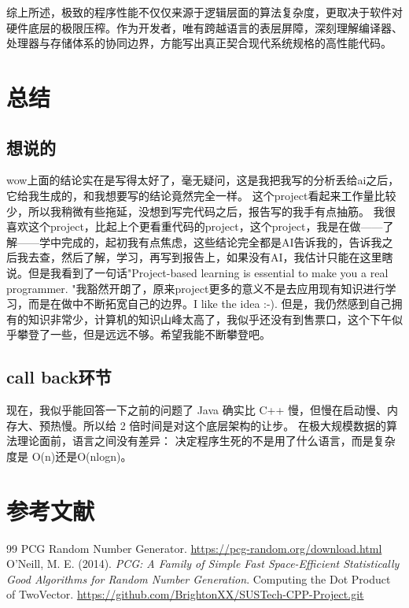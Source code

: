 \documentclass[UTF8]{ctexart}
\begin{document}
综上所述，极致的程序性能不仅仅来源于逻辑层面的算法复杂度，更取决于软件对硬件底层的极限压榨。作为开发者，唯有跨越语言的表层屏障，深刻理解编译器、处理器与存储体系的协同边界，方能写出真正契合现代系统规格的高性能代码。
\section{总结}
\subsection{想说的}wow上面的结论实在是写得太好了，毫无疑问，这是我把我写的分析丢给ai之后，它给我生成的，和我想要写的结论竟然完全一样。
这个project看起来工作量比较少，所以我稍微有些拖延，没想到写完代码之后，报告写的我手有点抽筋。
我很喜欢这个project，比起上个更看重代码的project，这个project，我是在做——了解——学中完成的，起初我有点焦虑，这些结论完全都是AI告诉我的，告诉我之后我去查，然后了解，学习，再写到报告上，如果没有AI，我估计只能在这里瞎说。但是我看到了一句话"Project-based learning is essential to make you a real programmer. "我豁然开朗了，原来project更多的意义不是去应用现有知识进行学习，而是在做中不断拓宽自己的边界。I like the idea :-).
但是，我仍然感到自己拥有的知识非常少，计算机的知识山峰太高了，我似乎还没有到售票口，这个下午似乎攀登了一些，但是远远不够。希望我能不断攀登吧。
\subsection{call back环节}
现在，我似乎能回答一下之前的问题了
Java 确实比 C++ 慢，但慢在启动慢、内存大、预热慢。所以给 2 倍时间是对这个底层架构的让步。
在极大规模数据的算法理论面前，语言之间没有差异： 决定程序生死的不是用了什么语言，而是复杂度是 
O(n)还是O(nlogn)。
\section{参考文献}
\begin{thebibliography}{99}
     PCG Random Number Generator. \url{https://pcg-random.org/download.html}
     O'Neill, M. E. (2014). \textit{PCG: A Family of Simple Fast Space-Efficient Statistically Good Algorithms for Random Number Generation}.
     Computing the Dot Product of TwoVector. \url{https://github.com/BrightonXX/SUSTech-CPP-Project.git}
\end{thebibliography}
\end{document}
